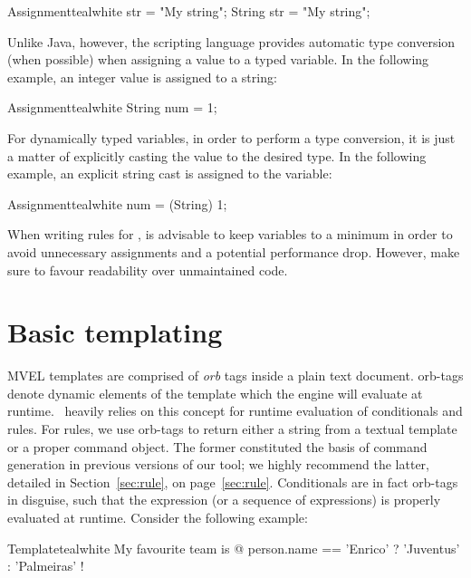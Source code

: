 \begin{codebox}{Assignment}{teal}{\icnote}{white}
str = "My string";
String str = "My string";
\end{codebox}

Unlike Java, however, the scripting language provides automatic type conversion (when possible) when assigning a value to a typed variable. In the following example, an integer value is assigned to a string:

\begin{codebox}{Assignment}{teal}{\icnote}{white}
String num = 1;
\end{codebox}

For dynamically typed variables, in order to perform a type conversion, it is just a matter of explicitly casting the value to the desired type. In the following example, an explicit string cast is assigned to the  variable:

\begin{codebox}{Assignment}{teal}{\icnote}{white}
num = (String) 1;
\end{codebox}

When writing rules for \arara, is advisable to keep variables to a minimum in order to avoid unnecessary assignments and a potential performance drop. However, make sure to favour readability over unmaintained code.

\section{Basic templating}
\label{sec:mvelbasictemplating}

\gls{MVEL} templates are comprised of \emph{orb} tags inside a plain text document. \Glspl{orb-tag} denote dynamic elements of the template which the engine will evaluate at runtime. \arara\ heavily relies on this concept for runtime evaluation of conditionals and rules. For rules, we use \glspl{orb-tag} to return either a string from a textual template or a proper command object. The former constituted the basis of command generation in previous versions of our tool; we highly recommend the latter, detailed in Section~\ref{sec:rule}, on page~\ref{sec:rule}. Conditionals are in fact \glspl{orb-tag} in disguise, such that the expression (or a sequence of expressions) is properly evaluated at runtime. Consider the following example:

\begin{codebox}{Template}{teal}{\icnote}{white}
My favourite team is @{ person.name == 'Enrico'
? 'Juventus' : 'Palmeiras' }!
\end{codebox}

